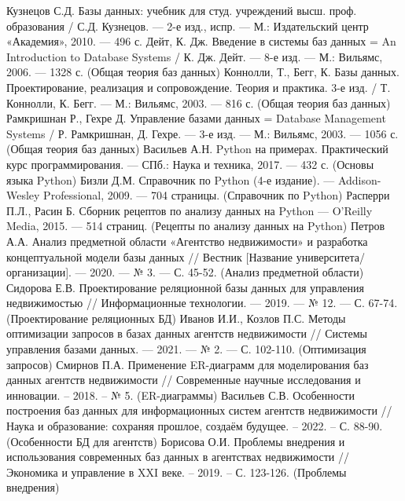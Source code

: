 
\begin{thebibliography}{9}

     Кузнецов С.Д. Базы данных: учебник для студ. учреждений высш. проф. образования / С.Д. Кузнецов. — 2-е изд., испр. — М.: Издательский центр «Академия», 2010. — 496 с.
     Дейт, К. Дж. Введение в системы баз данных = An Introduction to Database Systems / К. Дж. Дейт. — 8-е изд. — М.: Вильямс, 2006. — 1328 с. (Общая теория баз данных)
     Коннолли, Т., Бегг, К. Базы данных. Проектирование, реализация и сопровождение. Теория и практика. 3-е изд. / Т. Коннолли, К. Бегг. — М.: Вильямс, 2003. — 816 с. (Общая теория баз данных)
     Рамкришнан Р., Гехре Д. Управление базами данных = Database Management Systems / Р. Рамкришнан, Д. Гехре. — 3-е изд. — М.: Вильямс, 2003. — 1056 с. (Общая теория баз данных)
	 Васильев А.Н. Python на примерах. Практический курс программирования. — СПб.: Наука и техника, 2017. — 432 с. (Основы языка Python)
	 Бизли Д.М. Справочник по Python (4-е издание). — Addison-Wesley Professional, 2009. — 704 страницы. (Справочник по Python)
	 Расперри П.Л., Расин Б. Сборник рецептов по анализу данных на Python — O’Reilly Media, 2015. — 514 страниц. (Рецепты по анализу данных на Python)
	 Петров А.А. Анализ предметной области «Агентство недвижимости» и разработка концептуальной модели базы данных // Вестник [Название университета/организации]. — 2020. — № 3. — С. 45-52. (Анализ предметной области)
	 Сидорова Е.В. Проектирование реляционной базы данных для управления недвижимостью // Информационные технологии. — 2019. — № 12. — С. 67-74. (Проектирование реляционных БД) 
	 Иванов И.И., Козлов П.С. Методы оптимизации запросов в базах данных агентств недвижимости // Системы управления базами данных. — 2021. — № 2. — С. 102-110. (Оптимизация запросов)
	 Смирнов П.А. Применение ER-диаграмм для моделирования баз данных агентств недвижимости // Современные научные исследования и инновации. – 2018. – № 5. (ER-диаграммы)
	 Васильев С.В. Особенности построения баз данных для информационных систем агентств недвижимости // Наука и образование: сохраняя прошлое, создаём будущее. – 2022. – С. 88-90. (Особенности БД для агентств)
	 Борисова О.И. Проблемы внедрения и использования современных баз данных в агентствах недвижимости // Экономика и управление в XXI веке. – 2019. – С. 123-126. (Проблемы внедрения)

\end{thebibliography}
